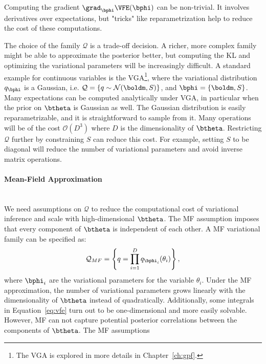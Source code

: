 Computing the gradient $\grad_{\bphi}\VFE(\bphi)$ can be non-trivial.
It involves derivatives over expectations, but "tricks" like reparametrization \cite{titsiasDoublyStochasticVariational} help to reduce the cost of these computations.

The choice of the family $\mathcal{Q}$ is a trade-off decision.
A richer, more complex family might be able to approximate the posterior better, but computing the \ac{KL} and optimizing the variational parameters will be increasingly difficult.
A standard example for continuous variables is the \ac{VGA}\footnote{The \ac{VGA} is explored in more details in Chapter~\ref{ch:gpf}.}, where the variational distribution $q_{\bphi}$ is a Gaussian, i.e. $\mathcal{Q} = \left\{q \sim \mathcal{N}(\boldm, S)\right\}$, and $\bphi = \{\boldm, S\}$.
Many expectations can be computed analytically under \ac{VGA}, in particular when the prior on $\btheta$ is Gaussian as well.
The Gaussian distribution is easily reparametrizable, and it is straightforward to sample from it.
Many operations will be of the cost $\mathcal{O}(D^3)$ where $D$ is the dimensionality of $\btheta$.
Restricting $\mathcal{Q}$ further by constraining $S$ can reduce this cost.
For example, setting $S$ to be diagonal will reduce the number of variational parameters and avoid inverse matrix operations.

\paragraph{Mean-Field Approximation}\mbox{}\\
We need assumptions on $\mathcal{Q}$ to reduce the computational cost of variational inference and scale with high-dimensional $\btheta$.
The \ac{MF} assumption imposes that every component of $\btheta$ is independent of each other.
A \ac{MF} variational family can be specified as:
\begin{align}
    \mathcal{Q}_{MF}= \left\{q = \prod_{i=1}^D q_{\bphi_i}(\theta_i)\right\},
\end{align}
where $\bphi_i$ are the variational parameters for the variable $\theta_i$.
Under the \ac{MF} approximation, the number of variational parameters grows linearly with the dimensionality of $\btheta$ instead of quadratically.
Additionally, some integrals in Equation~\ref{eq:vfe} turn out to be one-dimensional and more easily solvable.
However, \ac{MF} can not capture potential posterior correlations between the components of $\btheta$.
The \ac{MF} assumptions

